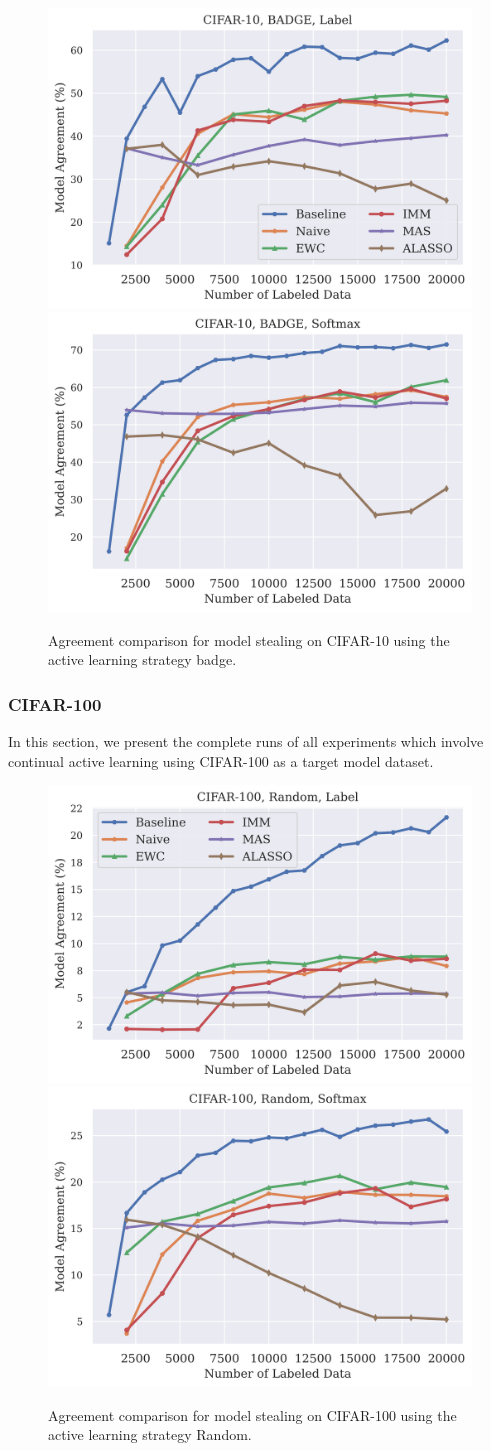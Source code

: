 \begin{figure}[!htb]
    \centering
    \includegraphics[width=0.48\linewidth]{images/results_CALMS/cifar_label_badge.png} \hfill
    \includegraphics[width=0.48\linewidth]{images/results_CALMS/cifar_softmax_badge.png}
    \caption{Agreement comparison for model stealing on CIFAR-10 using the active learning strategy \gls{badge}.}
    \label{fig:CALMSCIFAR10Badge}
\end{figure}

\clearpage

\subsubsection{CIFAR-100}
\label{sec:Appendix:CALMS:CIFAR100}
In this section, we present the complete runs of all experiments which involve continual active learning using CIFAR-100 as a target model dataset.

\begin{figure}[!htb]
    \centering
    \includegraphics[width=0.48\linewidth]{images/results_CALMS/cifar100_label_random.png} \hfill
    \includegraphics[width=0.48\linewidth]{images/results_CALMS/cifar100_softmax_random.png}
    \caption{Agreement comparison for model stealing on CIFAR-100 using the active learning strategy Random.}
    \label{fig:CALMSCIFAR100Random}
\end{figure}

